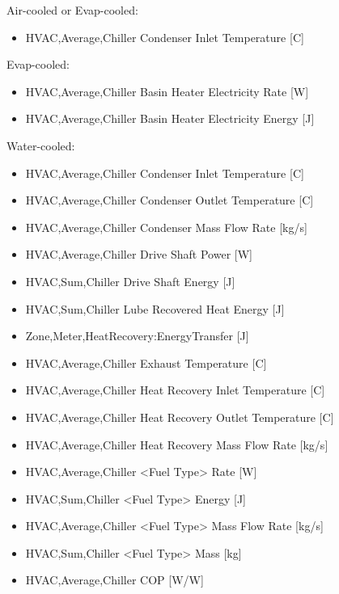 Air-cooled or Evap-cooled:

\begin{itemize}
    \tightlist
    \item
    HVAC,Average,Chiller Condenser Inlet Temperature {[}C{]}
\end{itemize}

Evap-cooled:

\begin{itemize}
    \item
    HVAC,Average,Chiller Basin Heater Electricity Rate {[}W{]}
    \item
    HVAC,Average,Chiller Basin Heater Electricity Energy {[}J{]}
\end{itemize}

Water-cooled:

\begin{itemize}
    \item
    HVAC,Average,Chiller Condenser Inlet Temperature {[}C{]}
    \item
    HVAC,Average,Chiller Condenser Outlet Temperature {[}C{]}
    \item
    HVAC,Average,Chiller Condenser Mass Flow Rate {[}kg/s{]}
    \item
    HVAC,Average,Chiller Drive Shaft Power {[}W{]}
    \item
    HVAC,Sum,Chiller Drive Shaft Energy {[}J{]}
    \item
    HVAC,Sum,Chiller Lube Recovered Heat Energy {[}J{]}
    \item
    Zone,Meter,HeatRecovery:EnergyTransfer {[}J{]}
    \item
    HVAC,Average,Chiller Exhaust Temperature {[}C{]}
    \item
    HVAC,Average,Chiller Heat Recovery Inlet Temperature {[}C{]}
    \item
    HVAC,Average,Chiller Heat Recovery Outlet Temperature {[}C{]}
    \item
    HVAC,Average,Chiller Heat Recovery Mass Flow Rate {[}kg/s{]}
    \item
    HVAC,Average,Chiller \textless{}Fuel Type\textgreater{} Rate {[}W{]}
    \item
    HVAC,Sum,Chiller \textless{}Fuel Type\textgreater{} Energy {[}J{]}
    \item
    HVAC,Average,Chiller \textless{}Fuel Type\textgreater{} Mass Flow Rate {[}kg/s{]}
    \item
    HVAC,Sum,Chiller \textless{}Fuel Type\textgreater{} Mass {[}kg{]}
    \item
    HVAC,Average,Chiller COP {[}W/W{]}
\end{itemize}

